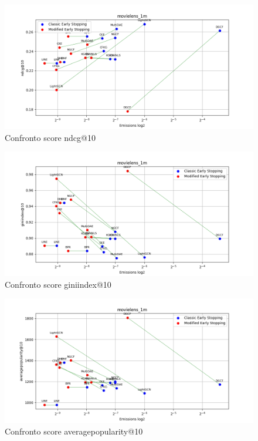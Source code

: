 \begin{figure}[H]
    \centering
    \includegraphics[width=\linewidth, trim=0 0 0 0]{images/ndcg@10_movielens_1m_30_5_comparison.png}
    \caption{Confronto score ndcg@10}
    
\end{figure}

\begin{figure}[H]
    \centering
    \includegraphics[width=\linewidth, trim=0 0 0 0]{images/giniindex@10_movielens_1m_30_5_comparison.png}
    \caption{Confronto score giniindex@10}
\end{figure}

\begin{figure}[H]
    \centering
    \includegraphics[width=\linewidth, trim=0 0 0 0]{images/averagepopularity@10_movielens_1m_30_5_comparison.png}
    \caption{Confronto score averagepopularity@10}
\end{figure}


